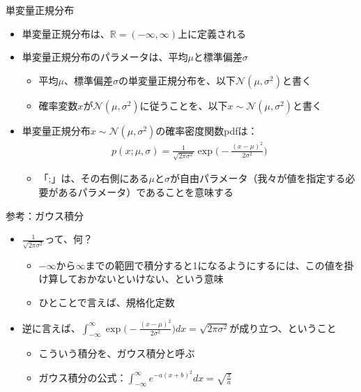 \documentclass[aspectratio=169,unicode,dvipdfmx,14pt]{beamer}
\begin{document}
\begin{frame}{単変量正規分布}
\begin{itemize}
\item 単変量正規分布は、$\mathbb{R}=(-\infty,\infty)$上に定義される
\item 単変量正規分布のパラメータは、平均$\mu$と標準偏差$\sigma$
\begin{itemize}
\item 平均$\mu$、標準偏差$\sigma$の単変量正規分布を、以下$\mathcal{N}(\mu,\sigma^2)$と書く
\item 確率変数$x$が$\mathcal{N}(\mu,\sigma^2)$に従うことを、以下$x\sim\mathcal{N}(\mu,\sigma^2)$と書く
\end{itemize}
\item 単変量正規分布$x\sim\mathcal{N}(\mu,\sigma^2)$の確率密度関数pdfは：
\begin{align}
p(x;\mu,\sigma) = \frac{1}{\sqrt{2\pi\sigma^2}}\exp\Big( - \frac{(x - \mu)^2}{2\sigma^2} \Big)
\end{align}
\begin{itemize}
\item 「;」は、その右側にある$\mu$と$\sigma$が自由パラメータ（我々が値を指定する必要があるパラメータ）であることを意味する
\end{itemize}
\end{itemize}
\end{frame}

\begin{frame}{参考：ガウス積分}
\begin{itemize}
\item $\frac{1}{\sqrt{2\pi\sigma^2}}$って、何？
\begin{itemize}
\item $-\infty$から$\infty$までの範囲で積分すると1になるようにするには、この値を掛け算しておかないといけない、という意味
\item ひとことで言えば、規格化定数
\end{itemize}
\item 逆に言えば、$\int_{-\infty}^\infty \exp\Big( - \frac{(x - \mu)^2}{2\sigma^2} \Big) dx = \sqrt{2\pi\sigma^2}$が成り立つ、ということ
\begin{itemize}
\item こういう積分を、ガウス積分と呼ぶ
\item ガウス積分の公式：$\int_{-\infty}^\infty e^{-a(x+b)^2}dx = \sqrt{\frac{\pi}{a}}$
\end{itemize}
\end{itemize}
\end{frame}
\end{document}
